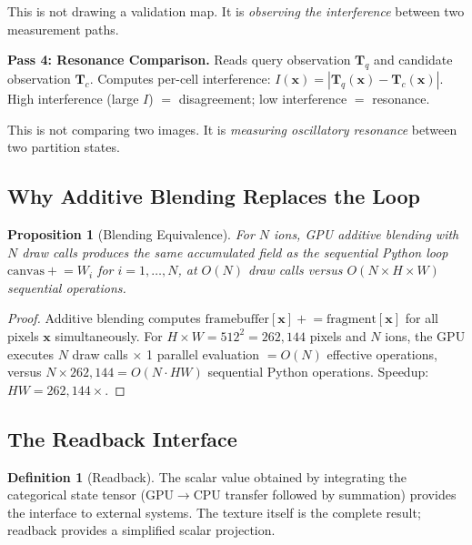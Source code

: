 \documentclass[11pt,twocolumn,a4paper]{article}
\newtheorem{proposition}[theorem]{Proposition}
\theoremstyle{definition}
\newtheorem{definition}[theorem]{Definition}
\theoremstyle{remark}
\newcommand{\Texture}{\mathbf{T}}
\begin{document}
This is not drawing a validation map. It is \emph{observing the interference} between two measurement paths.

\textbf{Pass 4: Resonance Comparison.} Reads query observation $\Texture_q$ and candidate observation $\Texture_c$. Computes per-cell interference: $I(\mathbf{x}) = |\Texture_q(\mathbf{x}) - \Texture_c(\mathbf{x})|$. High interference (large $I$) $=$ disagreement; low interference $=$ resonance.

This is not comparing two images. It is \emph{measuring oscillatory resonance} between two partition states.

\subsection{Why Additive Blending Replaces the Loop}

\begin{proposition}[Blending Equivalence]
\label{prop:blending}
For $N$ ions, GPU additive blending with $N$ draw calls produces the same accumulated field as the sequential Python loop $\mathrm{canvas} \mathrel{+}= W_i$ for $i = 1, \ldots, N$, at $O(N)$ draw calls versus $O(N \times H \times W)$ sequential operations.
\end{proposition}

\begin{proof}
Additive blending computes $\mathrm{framebuffer}[\mathbf{x}] \mathrel{+}= \mathrm{fragment}[\mathbf{x}]$ for all pixels $\mathbf{x}$ simultaneously. For $H \times W = 512^2 = 262{,}144$ pixels and $N$ ions, the GPU executes $N$ draw calls $\times$ 1 parallel evaluation $= O(N)$ effective operations, versus $N \times 262{,}144 = O(N \cdot HW)$ sequential Python operations. Speedup: $HW = 262{,}144\times$.
\end{proof}

\subsection{The Readback Interface}

\begin{definition}[Readback]
The scalar value obtained by integrating the categorical state tensor ($\mathrm{GPU} \to \mathrm{CPU}$ transfer followed by summation) provides the interface to external systems. The texture itself is the complete result; readback provides a simplified scalar projection.
\end{definition}

\end{document}
